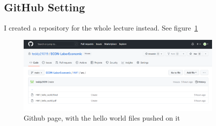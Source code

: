 \subsection{GitHub Setting}

I created a repository for the whole lecture instead. 
See figure~\ref{fig:github}

\begin{figure}[h]
    \centering
    \includegraphics[width = 0.9\textwidth]{image/github.png}
    \caption{Github page, with the hello world files pushed on it}
    \label{fig:github}
\end{figure}